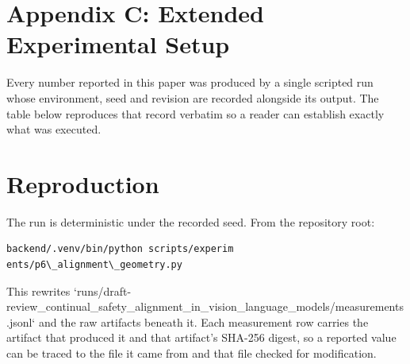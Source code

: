 \documentclass[10pt,journal,compsoc,twocolumn]{IEEEtran}
\begin{document}
\section{Appendix C: Extended Experimental Setup}


Every number reported in this paper was produced by a single scripted run whose environment, seed and revision are recorded alongside its output. The table below reproduces that record verbatim so a reader can establish exactly what was executed.
\begin{table}[htbp]
\centering
{}
\end{table}


\section{Reproduction}


The run is deterministic under the recorded seed. From the repository root:


\begin{scriptsize}
\begin{verbatim}
backend/.venv/bin/python scripts/experim
ents/p6\_alignment\_geometry.py
\end{verbatim}
\end{scriptsize}


This rewrites `runs/draft-review\_continual\_safety\_alignment\_in\_vision\_language\_models/measurements.jsonl` and the raw artifacts beneath it. Each measurement row carries the artifact that produced it and that artifact's SHA-256 digest, so a reported value can be traced to the file it came from and that file checked for modification.
\end{document}
